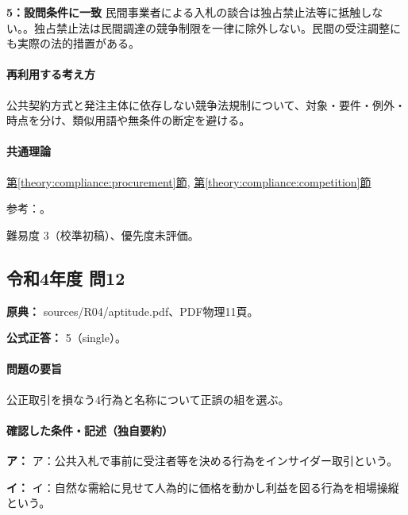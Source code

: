 \noindent\textbf{5：設問条件に一致} 民間事業者による入札の談合は独占禁止法等に抵触しない。。独占禁止法は民間調達の競争制限を一律に除外しない。民間の受注調整にも実際の法的措置がある。\par

\paragraph{再利用する考え方} 公共契約方式と発注主体に依存しない競争法規制について、対象・要件・例外・時点を分け、類似用語や無条件の断定を避ける。

\paragraph{共通理論} \hyperref[theory:compliance:procurement]{第\ref*{theory:compliance:procurement}節}, \hyperref[theory:compliance:competition]{第\ref*{theory:compliance:competition}節}

\par 参考：\cite{mof_procurement2006,jftc_rules,jftc_kansei,jftc_private2018}。

\par 難易度 3（校準初稿）、優先度未評価。

\subsection{令和4年度 問12}
\label{q:r04-reg-apt-12}

\noindent\textbf{原典：} sources/R04/aptitude.pdf、PDF物理11頁。

\textbf{公式正答：} 5（single）。

\paragraph{問題の要旨} 公正取引を損なう4行為と名称について正誤の組を選ぶ。

\paragraph{確認した条件・記述（独自要約）}\mbox{}\par

\noindent\textbf{ア：} ア：公共入札で事前に受注者等を決める行為をインサイダー取引という。\par

\noindent\textbf{イ：} イ：自然な需給に見せて人為的に価格を動かし利益を図る行為を相場操縦という。\par

